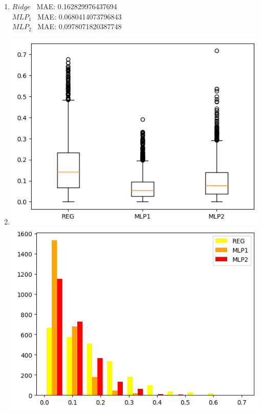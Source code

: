 \documentclass[12pt]{article}
\begin{document}
\begin{enumerate}[leftmargin=\labelsep,resume]
\item
$Ridge$ \ MAE: 0.162829976437694 \\
$MLP_1$ \ MAE: 0.0680414073796843 \\
$MLP_2$ \ MAE: 0.0978071820387748

\item 
\leavevmode\vadjust{\vspace{-\baselineskip}}
\begin{center}
\includegraphics[]{images/boxplot.png}
\newline
\includegraphics[scale = 0.97]{images/histogram.png}
\end{center}


\end{enumerate}
\end{document}
